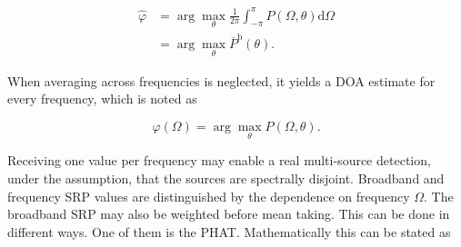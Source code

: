 
\begin{equation}
\begin{split}
\hat{\varphi} &= \arg \max_{\theta}\frac{1}{2\pi}\int^\pi_{-\pi}P(\Omega,\theta)\mathrm{d}\Omega\\
 &= \arg \max_{\theta} \overline{P}^\text{b}(\theta).
\end{split}
\label{eq:doa_est_broadband}
\end{equation}

When averaging across frequencies is neglected, it yields a \ac{DOA} estimate for every frequency, which is noted as

\begin{equation}
\hat{\varphi}(\Omega) = \arg\max_{\theta}P(\Omega,\theta).
\label{eq:doa_est_freq}
\end{equation}

Receiving one value per frequency may enable a real multi-source detection, under the assumption, that the sources are spectrally disjoint. Broadband and frequency SRP values are distinguished by the dependence on frequency $\Omega$.
The broadband \ac{SRP} may also be weighted before mean taking. This can be done in different ways. One of them is the \ac{PHAT}. Mathematically this can be stated as

